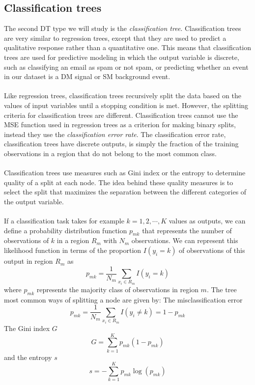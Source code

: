 \documentclass[12pt, a4paper]{book}
\begin{document}
\subsection{Classification trees}
The second DT type we will study is the \textit{classification tree}. Classification trees are very similar to regression trees, except that they are used to predict a qualitative response rather than a quantitative one. This means that classification trees are used for predictive modeling in 
which the output variable is discrete, such as classifying an email as spam or not spam, or predicting whether an event in our dataset is a DM signal or SM background event.\\
\\Like regression trees, classification trees recursively split the data based on the values of input variables until a stopping condition is met. However, the splitting criteria for classification trees are different. Classification trees cannot use the MSE function used in regression trees 
as a criterion for making binary splits, instead they use the \textit{classification error rate}. The classification error rate, classification trees have discrete outputs, is simply the fraction of the training observations in a region that do not belong to the most common class.\\
\\Classification trees use measures such as Gini index or the entropy to determine quality of a split at each node. The idea behind these quality measures is to select the split that maximizes the separation between the different categories of the output variable.\\
\\If a classification task takes for example $k=1,2,\cdots,K$ values as outputs, we can define a probability distribution function $p_{mk}$ that represents the number of observations of $k$ in a region $R_m$ with $N_m$ observations. We can represent this likelihood function in terms 
of the proportion $I(y_i=k)$ of observations of this output in region $R_m$ as
$$
p_{mk}=\frac{1}{N_m}\sum_{x_i\in R_m}I(y_i=k)
$$
where $p_{mk}$ represents the majority class of observations in region $m$. The tree most common ways of splitting a node are given by: The misclassification error
$$
p_{mk}=\frac{1}{N_m}\sum_{x_i\in R_m}I(y_i\ne k) = 1-p_{mk}
$$
The Gini index $G$
\begin{equation}\label{eq:gini}
    G=\sum_{k=1}^K p_{mk}(1-p_{mk})
\end{equation}
and the entropy $s$
$$
s=-\sum_{k=1}^K p_{mk}\log(p_{mk})
$$
\end{document}
